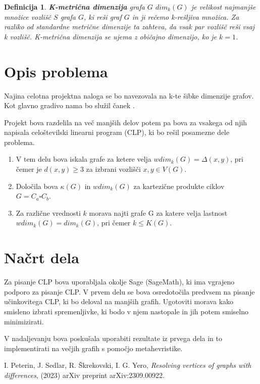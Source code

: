 \documentclass[a4paper,12pt]{article}
\newtheorem{definition}{Definicija}
\begin{document}
    \begin{definition}
        {\bf K-metrična dimenzija} grafa $G$ $dim_k(G)$ je velikost najmanjše množice vozlišč $S$ grafa $G$, ki reši graf $G$ in ji rečemo k-rešljiva množica. 
        Za razliko od standardne metrične dimenzije ta zahteva, da vsak par vozlišč reši vsaj k vozlišč. K-metrična dimenzija se ujema z običajno dimenzijo, ko je $k = 1$.
    \end{definition}
\section{Opis problema} 
Najina celotna projektna naloga se bo navezovala na k-te šibke dimenzije grafov. Kot glavno gradivo nama bo služil čanek \cite{peterin2023resolving}.

Projekt bova razdelila na več manjših delov potem pa bova za vsakega od njih napisala celoštevilski linearni program (CLP), ki bo rešil posamezne dele problema. 

\begin{enumerate}
    \item V tem delu bova iskala grafe za ketere velja $wdim_k(G) = \Delta (x,y)$, pri čemer je $d(x,y) \geq 3$ za izbrani vozlišči $x, y \in V(G)$.

    \item Določila bova $\kappa(G)$ in $wdim_k(G)$ za kartezične produkte ciklov $G = C_a \square C_b$.
    
    \item Za različne vrednosti $k$ morava najti grafe G za katere velja lastnost $wdim_k(G) = dim_k(G)$, pri čemer $k \leq K(G)$.
\end{enumerate}

\section{Načrt dela}
Za pisanje CLP bova uporabljala okolje Sage (SageMath), ki ima vgrajeno podporo za pisanje CLP. V prvem delu se bova osredotočila predvsem na pisanje učinkovitega CLP, ki bo deloval na manjših grafih. Ugotoviti morava kako smisleno izbrati spremenljivke, ki bodo v njem nastopale in jih potem smiselno minimizirati. 

V nadaljevanju bova poskušala uporabiti rezultate iz prvega dela in to implementirati na večjih grafih s pomočjo metahevristike.




\begin{thebibliography}{99}
    I. Peterin, J. Sedlar, R. Škrekovski, I. G. Yero,
    \emph{Resolving vertices of graphs with differences},
    (2023) arXiv preprint arXiv:2309.00922.
    \end{thebibliography}
\end{document}
